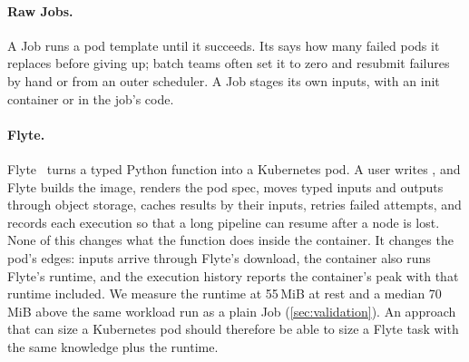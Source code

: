 \paragraph{Raw Jobs.}
A  Job runs a pod template until it succeeds. Its  says how many failed pods
it replaces before giving up; batch teams often set it to zero and resubmit failures by hand or from an outer
scheduler. A Job stages its own inputs, with an init container or in the job's code.

\paragraph{Flyte.}
Flyte~\citep{flyte} turns a typed Python function into a Kubernetes pod. A user writes
, and Flyte builds the image, renders the pod spec, moves typed
inputs and outputs through object storage, caches results by their inputs, retries failed attempts, and records
each execution so that a long pipeline can resume after a node is lost. None of this changes what the function
does inside the container. It changes the pod's edges: inputs arrive through Flyte's download, the container
also runs Flyte's runtime, and the execution history reports the container's peak with that runtime included.
We measure the runtime at 55\,MiB at rest and a median 70\,MiB above the same workload run as a plain Job
(\cref{sec:validation}). An approach that can size a Kubernetes pod should therefore be able to size a Flyte
task with the same knowledge plus the runtime.

